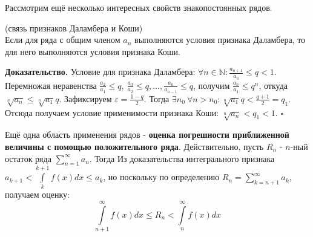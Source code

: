 Рассмотрим ещё несколько интересных свойств знакопостоянных рядов. 
\begin{theor}
    (связь признаков Даламбера и Коши)\\
    Если для ряда с общим членом $a_n$ выполняются условия признака Даламбера,
    то для него выполняются условия признака Коши. 
\end{theor}
\textbf{Доказательство.} Условие для признака Даламбера: 
$\forall n\in\mathbb{N}:\frac{a_{n+1}}{a_n}\leqslant q<1$. Перемножая 
неравенства $\frac{a_2}{a_1}\leqslant q,~\frac{a_3}{a_2}\leqslant q,...
,\frac{a_n}{a_{n-1}}\leqslant q$, получим $\frac{a_n}{a_1}\leqslant q^n$, 
откуда $\sqrt[n]{a_n}\leqslant\sqrt[n]{a_1}q$. Зафиксируем 
$\varepsilon=\frac{1-q}{2}$. Тогда $\exists n_0~\forall n>n_0:\sqrt[n]{a_1}q<
\frac{q+1}{2}=q_1$. Отсюда получаем условие применимости признака Коши:
$\sqrt[n]{a_n}<q_1<1$. $\square$ 

Ещё одна область применения рядов - \textbf{оценка погрешности приближенной 
величины с помощью положительного ряда}. Действительно, пусть 
$R_n$ -  $n$-ный остаток ряда  $\sum\limits_{n=1}^{\infty} a_n$. Тогда
Из доказательства интегрального признака $a_{k+1}<\int\limits_{k}^{k+1}f(x)dx
\leqslant a_k$, но поскольку по определению $R_n=\sum\limits_{k=n+1}^{\infty}
a_k$, получаем оценку:
$$\int\limits_{n+1}^{\infty}f(x)dx\leqslant R_n<
\int\limits_{n}^{\infty}f(x)dx$$ 













